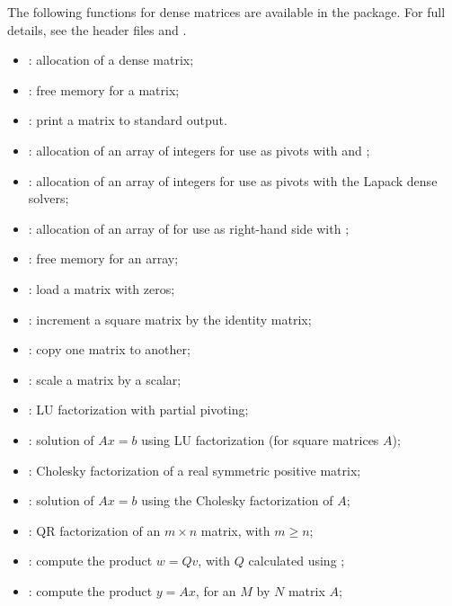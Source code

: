 The following functions for  dense matrices are available
in the {\dense} package.  For full details, see the header files
 and .
\begin{itemize}
\item {}: allocation of a  dense matrix;
\item {}: free memory for a  matrix;
\item {}: print a  matrix to standard output.
\item {}: allocation of an array of  integers for use
  as pivots with  and ;
\item {}: allocation of an array of  integers for use
  as pivots with the Lapack dense solvers;
\item {}: allocation of an array of  for use
  as right-hand side with ;
\item {}: free memory for an array;
\item {}: load a matrix with zeros;
\item {}: increment a square matrix by the identity matrix;
\item {}: copy one matrix to another;
\item {}: scale a matrix by a scalar;
\item {}: LU factorization with partial pivoting;
\item {}: solution of $Ax = b$ using LU factorization (for square matrices $A$);
\item {}: Cholesky factorization of a real symmetric positive matrix;
\item {}: solution of $Ax = b$ using the Cholesky factorization of $A$;
\item {}: QR factorization of an $m \times n$ matrix, with $m \ge n$;
\item {}: compute the product $w = Qv$, with $Q$ calculated using ;
\item {}: compute the product $y = Ax$, for an $M$ by $N$ matrix $A$;
\end{itemize}

